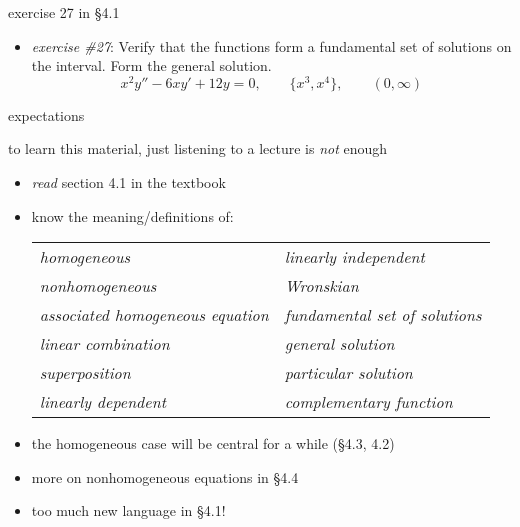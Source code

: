 \documentclass{beamer}
\begin{document}
\begin{frame}{exercise 27 in \S 4.1}

\begin{itemize}
\item \emph{exercise \#27}:  Verify that the functions form a fundamental set  of solutions on the interval.  Form the general solution.
    $$x^2 y''-6xy'+12y=0, \qquad \{x^3,x^4\}, \qquad (0,\infty)$$
\end{itemize}

\vspace{50mm}
\end{frame}


\begin{frame}{expectations}

to learn this material, just listening to a lecture is \emph{not} enough
\begin{itemize}
     \item \emph{read} section 4.1 in the textbook
         \item know the meaning/definitions of:

\bigskip
             \hspace{-10mm} \begin{tabular}{ll}
             \emph{homogeneous}                     & \emph{linearly independent} \\
             \emph{nonhomogeneous}                  & \emph{Wronskian} \\
             \emph{associated homogeneous equation} & \emph{fundamental set of solutions} \\
             \emph{linear combination}              & \emph{general solution} \\
             \emph{superposition}                   & \emph{particular solution} \\
             \emph{linearly dependent}              & \emph{complementary function}                          
             \end{tabular}

\bigskip
         \item the homogeneous case will be central for a while (\S4.3, 4.2)
         \item more on nonhomogeneous equations in \S4.4
         \item \alert{too much new language in \S4.1!}
\end{itemize}
\end{frame}
\end{document}
